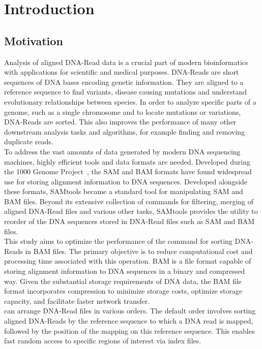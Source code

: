 \section{Introduction}

\subsection{Motivation}
Analysis of aligned DNA-Read data is a crucial part of modern bioinformatics with applications for scientific and medical purposes. DNA-Reads are short sequences of DNA bases encoding genetic information. They are aligned to a reference sequence to find variants, disease causing mutations and understand evolutionary relationships between species. In order to analyze specific parts of a genome, such as a single chromosome and to locate mutations or variations, DNA-Reads are sorted. This also improves the performance of many other downstream analysis tasks and algorithms, for example finding and removing duplicate reads. \\

To address the vast amounts of data generated by modern DNA sequencing machines, highly efficient tools and data formats are needed. Developed during the 1000 Genome Project~\cite{the_1000_genomes_project_consortium_1000_2012}, the SAM and BAM formats have found widespread use for storing alignment information to DNA sequences. Developed alongside these formats, SAMtools became a standard tool for manipulating SAM and BAM files. Beyond its extensive collection of commands for filtering, merging of aligned DNA-Read files and various other tasks, SAMtools provides the  \sort utility to reorder of the DNA sequences stored in DNA-Read files such as SAM and BAM files. \\

This study aims to optimize the performance of the \sort command for sorting DNA-Reads in BAM files. The primary objective is to reduce computational cost and processing time associated with this operation. BAM is a file format capable of storing alignment information to DNA sequences in a binary and compressed way. Given the substantial storage requirements of DNA data, the BAM file format incorporates compression to minimize storage costs, optimize storage capacity, and facilitate faster network transfer.\\

\sort can arrange DNA-Read files in various orders. The default order involves sorting aligned DNA-Reads by the reference sequence to which a DNA read is mapped, followed by the position of the mapping on this reference sequence. This enables fast random access to specific regions of interest via index files. \\

